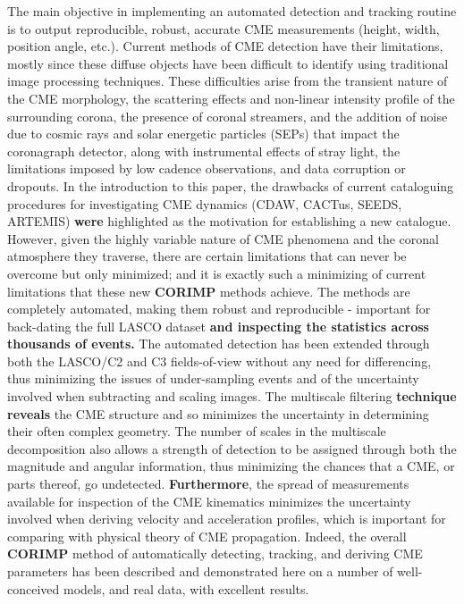 \documentclass[preprint2]{aastex}
\begin{document}
The main objective in implementing an automated detection and tracking routine is to output reproducible, robust, accurate CME measurements (height, width, position angle, etc.). Current methods of CME detection have their limitations, mostly since these diffuse objects have been difficult to identify using traditional image processing techniques. These difficulties arise from the transient nature of the CME morphology, the scattering effects and non-linear intensity profile of the surrounding corona, the presence of coronal streamers, and the addition of noise due to cosmic rays and solar energetic particles (SEPs) that impact the coronagraph detector, along with instrumental effects of stray light, the limitations imposed by low cadence observations, and data corruption or dropouts. In the introduction to this paper, the drawbacks of current cataloguing procedures for investigating CME dynamics (CDAW, CACTus, SEEDS, ARTEMIS) {\bf were} highlighted as the motivation for establishing a new catalogue. However, given the highly variable nature of CME phenomena and the coronal atmosphere they traverse, there are certain limitations that can never be overcome but only minimized; and it is exactly such a minimizing of current limitations that these new {\bf CORIMP} methods achieve. The methods are completely automated, making them robust and reproducible - important for back-dating the full LASCO dataset {\bf and inspecting the statistics across thousands of events.} The automated detection has been extended through both the LASCO/C2 and C3 fields-of-view without any need for differencing, thus minimizing the issues of under-sampling events and of the uncertainty involved when subtracting and scaling images. The multiscale filtering {\bf technique reveals} the CME structure and so minimizes the uncertainty in determining their often complex geometry. The number of scales in the multiscale decomposition also allows a strength of detection to be assigned through both the magnitude and angular information, thus minimizing the chances that a CME, or parts thereof, go undetected. {\bf Furthermore}, the spread of measurements available for inspection of the CME kinematics minimizes the uncertainty involved when deriving velocity and acceleration profiles, which is important for comparing with physical theory of CME propagation. Indeed, the overall {\bf CORIMP} method of automatically detecting, tracking, and deriving CME parameters has been described and demonstrated here on a number of well-conceived models, and real data, with excellent results.
\end{document}
